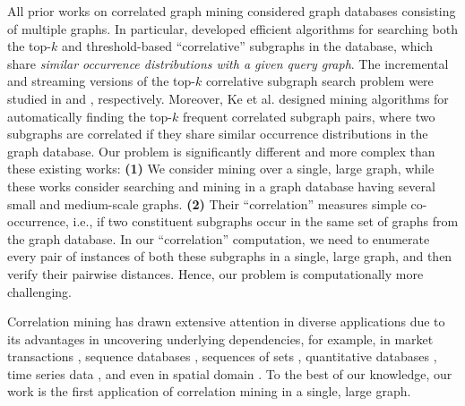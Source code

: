 \vspace{-0.05in}
All prior works on correlated graph mining \cite{KCN08,KCY09,KeCY09,LatsiouP11,ZouCL09,KeCN07} considered
graph databases consisting of multiple graphs. In particular, \cite{ZouCL09,KCN08,KeCY09,KeCN07}
developed efficient algorithms for searching both the top-$k$ and threshold-based ``correlative'' subgraphs in the
database, which share {\em similar occurrence distributions with a given query graph}.
The incremental and streaming versions of the top-$k$ correlative subgraph search problem
were studied in \cite{LatsiouP11} and \cite{PanZ12}, respectively. Moreover, Ke et al. \cite{KCY09}
designed mining algorithms for automatically finding the top-$k$ frequent correlated subgraph pairs,
where two subgraphs are correlated if they share similar occurrence distributions
in the graph database. Our problem is significantly different and more complex than these
existing works: {\bf (1)} We consider mining over a single, large graph, while these works
consider searching and mining in a graph database having several small and medium-scale graphs.
{\bf (2)} Their ``correlation'' measures simple co-occurrence, i.e., if two
constituent subgraphs occur in the same set of graphs from the graph database.
In our ``correlation'' computation, we need to enumerate every pair of instances of
both these subgraphs in a single, large graph, and then verify their pairwise distances.
Hence, our {} problem is computationally more challenging.

\vspace{-0.05in}
Correlation mining has drawn extensive attention in diverse applications
due to its advantages in uncovering underlying dependencies, for example,
in market transactions \cite{XSTK04,ZX08,LeeKCH03}, sequence databases \cite{LinJDH12},
sequences of sets \cite{Benson0T18}, quantitative databases \cite{KeCN08}, time series data \cite{MueenNL10,HoPVHB19},
and even in spatial domain \cite{ChanLYW19}. To the best of our knowledge,
our work is the first application of correlation mining in a single, large graph.
